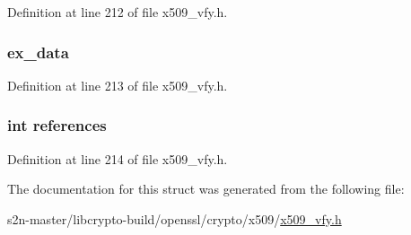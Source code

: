 Definition at line 212 of file x509\+\_\+vfy.\+h.

\subsubsection[{\texorpdfstring{ex\+\_\+data}{ex_data}}]{ ex\+\_\+data}\hypertarget{structx509__store__st_ac3e4fd59d6ee44a81f3a58114613c1e2}{}\label{structx509__store__st_ac3e4fd59d6ee44a81f3a58114613c1e2}


Definition at line 213 of file x509\+\_\+vfy.\+h.

\subsubsection[{\texorpdfstring{references}{references}}]{\setlength{\rightskip}{0pt plus 5cm}int references}\hypertarget{structx509__store__st_a146fdb34d9a909e530adf8b189481195}{}\label{structx509__store__st_a146fdb34d9a909e530adf8b189481195}


Definition at line 214 of file x509\+\_\+vfy.\+h.



The documentation for this struct was generated from the following file\+:\begin{DoxyCompactItemize}
\item 
s2n-\/master/libcrypto-\/build/openssl/crypto/x509/\hyperlink{crypto_2x509_2x509__vfy_8h}{x509\+\_\+vfy.\+h}\end{DoxyCompactItemize}
